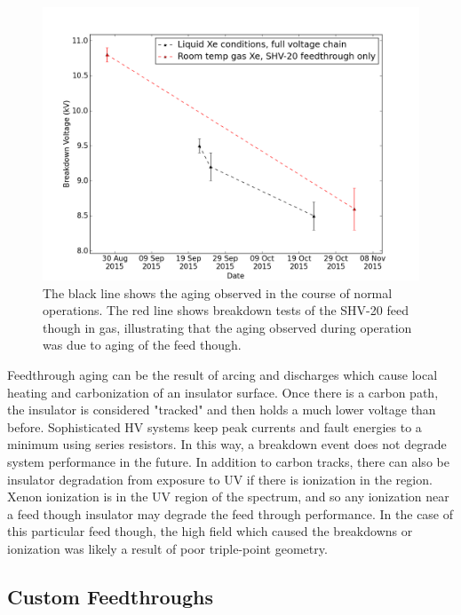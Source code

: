 \begin{figure}[htbp]
\begin{center}
\includegraphics[width=5in]{figures/testbed/shv20_breakdowns.png}
\caption{The black line shows the aging observed in the course of normal operations. The red line shows breakdown tests of the SHV-20 feed though in gas, illustrating that the aging observed during operation was due to aging of the feed though.}
\label{fig:aging}
\end{center}
\end{figure}

Feedthrough aging can be the result of arcing and discharges which cause local heating and carbonization of an insulator surface. Once there is a carbon path, the insulator is considered "tracked" and then holds a much lower voltage than before.  Sophisticated \ac{HV} systems keep peak currents and fault energies to a minimum using series resistors. In this way, a breakdown event does not degrade system performance in the future. In addition to carbon tracks, there can also be insulator degradation from exposure to UV if there is ionization in the region. Xenon ionization is in the UV region of the spectrum, and so any ionization near a feed though insulator may degrade the feed through performance. In the case of this particular feed though, the high field which caused the breakdowns or ionization was likely a result of poor triple-point geometry. 


\subsection{Custom Feedthroughs}


